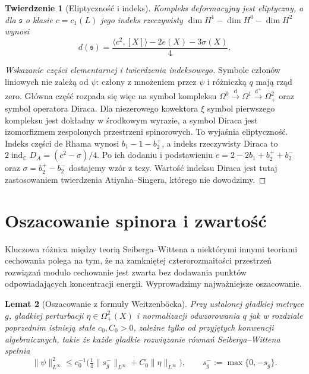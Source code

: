 \documentclass[11pt,a4paper]{report}
\numberwithin{equation}{section}
\theoremstyle{plain}
\newtheorem{twierdzenie}{Twierdzenie}[section]
\newtheorem{lemat}[twierdzenie]{Lemat}
\theoremstyle{definition}
\theoremstyle{remark}
\begin{document}
\begin{twierdzenie}[Eliptyczność i indeks]
\label{thm:tg-sw-elliptic}
Kompleks deformacyjny jest eliptyczny, a dla $\mathfrak s$
o klasie $c=c_1(L)$ jego indeks rzeczywisty
$\dim H^1-\dim H^0-\dim H^2$ wynosi
\[
d(\mathfrak s)=\frac{\langle c^2,[X]\rangle-2e(X)-3\sigma(X)}4.
\]
\end{twierdzenie}

\begin{proof}[Wskazanie części elementarnej i twierdzenia indeksowego]
Symbole członów liniowych nie zależą od $\psi$:
człony z mnożeniem przez $\psi$ i różniczką $q$ mają rząd zero.
Główna część rozpada się więc na symbol kompleksu
$\Omega^0\xrightarrow{\mathrm d}\Omega^1
\xrightarrow{\mathrm d^+}\Omega^2_+$ oraz symbol operatora Diraca.
Dla niezerowego kowektora $\xi$ symbol pierwszego
kompleksu jest dokładny w środkowym wyrazie, a symbol
Diraca jest izomorfizmem zespolonych przestrzeni spinorowych.
To wyjaśnia eliptyczność.
Indeks części de Rhama wynosi $b_1-1-b_2^+$,
a indeks rzeczywisty Diraca to
$2\operatorname{ind}_{\mathbb C}D_A=(c^2-\sigma)/4$.
Po ich dodaniu i podstawieniu
$e=2-2b_1+b_2^++b_2^-$ oraz
$\sigma=b_2^+-b_2^-$ dostajemy wzór z tezy.
Wartość indeksu Diraca jest tutaj zastosowaniem
twierdzenia Atiyaha--Singera, którego nie dowodzimy.
\end{proof}

\section{Oszacowanie spinora i zwartość}
\label{sec:tg-sw-compact}

Kluczowa różnica między teorią Seiberga--Wittena a niektórymi
innymi teoriami cechowania polega na tym, że na zamkniętej
czterorozmaitości przestrzeń rozwiązań modulo cechowanie
jest zwarta bez dodawania punktów odpowiadających
koncentracji energii. Wyprowadzimy najważniejsze oszacowanie.

\begin{lemat}[Oszacowanie z formuły Weitzenböcka]
\label{lem:tg-sw-bound}
Przy ustalonej gładkiej metryce $g$, gładkiej perturbacji
$\eta\in\Omega^2_+(X)$ i normalizacji odwzorowania $q$
jak w rozdziale poprzednim istnieją stałe $c_0,C_0>0$,
zależne tylko od przyjętych konwencji algebraicznych, takie że
każde gładkie rozwiązanie równań Seiberga--Wittena spełnia
\[
\|\psi\|_{L^\infty}^2\le
c_0^{-1}\bigl(\tfrac14\|s_g^-\|_{L^\infty}
+C_0\|\eta\|_{L^\infty}\bigr),
\qquad s_g^-:=\max\{0,-s_g\}.
\]
\end{lemat}
\end{document}
